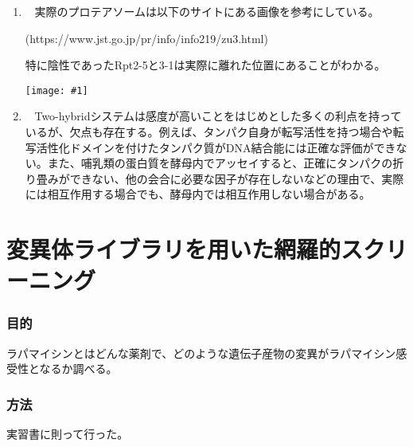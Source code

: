 \documentclass[a4paper,papersize,dvipdfmx]{jsarticle}
\newcommand{\pict}[2]{\begin{center} \texttt{[image: \#1]} \end{center}}   %
\newcommand{\mon}[1]{\item[({#1})] \ }
\begin{document}
\begin{enumerate}
\mon{1} 実際のプロテアソームは以下のサイトにある画像を参考にしている。

(https://www.jst.go.jp/pr/info/info219/zu3.html)

特に陰性であったRpt2-5と3-1は実際に離れた位置にあることがわかる。
\pict{img3/real.png}{7}

\mon{2} Two-hybridシステムは感度が高いことをはじめとした多くの利点を持っているが、欠点も存在する。例えば、タンパク自身が転写活性を持つ場合や転写活性化ドメインを付けたタンパク質がDNA結合能には正確な評価ができない。また、哺乳類の蛋白質を酵母内でアッセイすると、正確にタンパクの折り畳みができない、他の会合に必要な因子が存在しないなどの理由で、実際には相互作用する場合でも、酵母内では相互作用しない場合がある。
\end{enumerate}

\part*{変異体ライブラリを用いた網羅的スクリーニング}

\section*{目的}
ラパマイシンとはどんな薬剤で、どのような遺伝子産物の変異がラパマイシン感受性となるか調べる。

\section*{方法}
実習書に則って行った。
\end{document}
